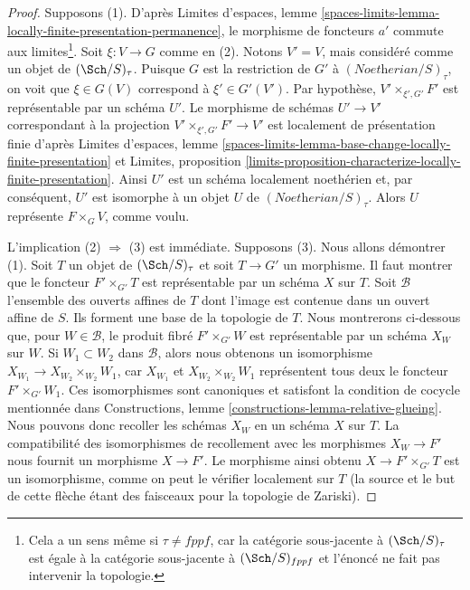 \begin{proof}
Supposons (1). D'après Limites d'espaces, lemme
\ref{spaces-limits-lemma-locally-finite-presentation-permanence},
le morphisme de foncteurs $a'$ commute aux limites\footnote{Cela
a un sens même si $\tau \not = fppf$, car la catégorie sous-jacente
à $(\Sch/S)_\tau$ est égale à la catégorie sous-jacente
à $(\Sch/S)_{fppf}$ et l'énoncé ne fait pas intervenir la topologie.}.
Soit $\xi : V \to G$ comme en (2). Notons $V' = V$, mais considéré comme un
objet de $(\Sch/S)_\tau$. Puisque $G$ est la restriction de
$G'$ à $(\textit{Noetherian}/S)_\tau$, on voit que
$\xi \in G(V)$ correspond à $\xi' \in G'(V')$.
Par hypothèse, $V' \times_{\xi', G'} F'$ est représentable
par un schéma $U'$. Le morphisme de schémas $U' \to V'$ correspondant à
la projection $V' \times_{\xi', G'} F' \to V'$ est localement de
présentation finie d'après
Limites d'espaces, lemme
\ref{spaces-limits-lemma-base-change-locally-finite-presentation} et
Limites, proposition
\ref{limits-proposition-characterize-locally-finite-presentation}.
Ainsi $U'$ est un schéma localement noethérien et, par conséquent, $U'$ est
isomorphe à un objet $U$ de $(\textit{Noetherian}/S)_\tau$.
Alors $U$ représente $F \times_G V$, comme voulu.

\medskip\noindent
L'implication (2) $\Rightarrow$ (3) est immédiate. Supposons (3).
Nous allons démontrer (1). Soit $T$ un objet de $(\Sch/S)_\tau$
et soit $T \to G'$ un morphisme. Il faut montrer que
le foncteur $F' \times_{G'} T$ est représentable par un schéma $X$
sur $T$. Soit $\mathcal{B}$ l'ensemble des ouverts affines de
$T$ dont l'image est contenue dans un ouvert affine de $S$. Ils forment une base
de la topologie de $T$. Nous montrerons ci-dessous que, pour $W \in \mathcal{B}$,
le produit fibré $F' \times_{G'} W$ est représentable
par un schéma $X_W$ sur $W$. Si $W_1 \subset W_2$ dans $\mathcal{B}$, alors
nous obtenons un isomorphisme $X_{W_1} \to X_{W_2} \times_{W_2} W_1$, car
$X_{W_1}$ et $X_{W_2} \times_{W_2} W_1$ représentent tous deux le foncteur
$F' \times_{G'} W_1$.
Ces isomorphismes sont canoniques et satisfont la condition de cocycle
mentionnée dans Constructions, lemme
\ref{constructions-lemma-relative-glueing}.
Nous pouvons donc recoller les schémas $X_W$ en un schéma $X$ sur $T$.
La compatibilité des isomorphismes de recollement avec les morphismes
$X_W \to F'$ nous fournit un morphisme $X \to F'$.
Le morphisme ainsi obtenu $X \to F' \times_{G'} T$ est un
isomorphisme, comme on peut le vérifier localement sur $T$ (la source
et le but de cette flèche étant des faisceaux pour la topologie de Zariski).


\end{proof}
